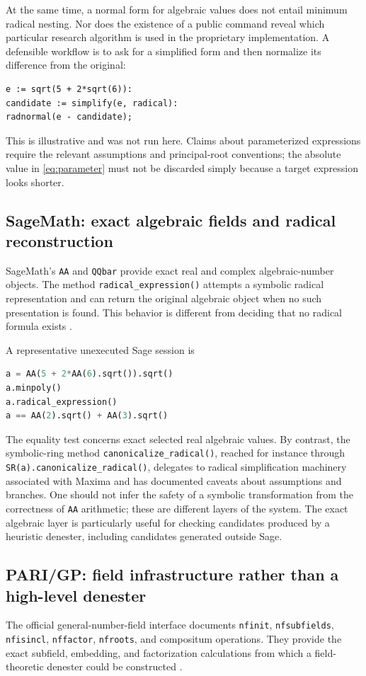 \documentclass[11pt,oneside]{article}
\numberwithin{equation}{section}
\theoremstyle{definition}
\theoremstyle{remark}
\begin{document}
At the same time, a normal form for algebraic values does not entail minimum radical nesting. Nor does the existence of a public command reveal which particular research algorithm is used in the proprietary implementation. A defensible workflow is to ask for a simplified form and then normalize its difference from the original:
\begin{lstlisting}
e := sqrt(5 + 2*sqrt(6)):
candidate := simplify(e, radical):
radnormal(e - candidate);
\end{lstlisting}
This is illustrative and was not run here. Claims about parameterized expressions require the relevant assumptions and principal-root conventions; the absolute value in \eqref{eq:parameter} must not be discarded simply because a target expression looks shorter.

\subsection{SageMath: exact algebraic fields and radical reconstruction}
SageMath's \texttt{AA} and \texttt{QQbar} provide exact real and complex algebraic-number objects. The method \texttt{radical\_expression()} attempts a symbolic radical representation and can return the original algebraic object when no such presentation is found. This behavior is different from deciding that no radical formula exists \cite{sage}.

A representative unexecuted Sage session is
\begin{lstlisting}[language=Python]
a = AA(5 + 2*AA(6).sqrt()).sqrt()
a.minpoly()
a.radical_expression()
a == AA(2).sqrt() + AA(3).sqrt()
\end{lstlisting}
The equality test concerns exact selected real algebraic values. By contrast, the symbolic-ring method \texttt{canonicalize\_radical()}, reached for instance through \texttt{SR(a).canonicalize\_radical()}, delegates to radical simplification machinery associated with Maxima and has documented caveats about assumptions and branches. One should not infer the safety of a symbolic transformation from the correctness of \texttt{AA} arithmetic; these are different layers of the system. The exact algebraic layer is particularly useful for checking candidates produced by a heuristic denester, including candidates generated outside Sage.

\subsection{PARI/GP: field infrastructure rather than a high-level denester}
The official general-number-field interface documents \texttt{nfinit}, \texttt{nfsubfields}, \texttt{nfisincl}, \texttt{nffactor}, \texttt{nfroots}, and compositum operations. They provide the exact subfield, embedding, and factorization calculations from which a field-theoretic denester could be constructed \cite{pari}.
\end{document}
